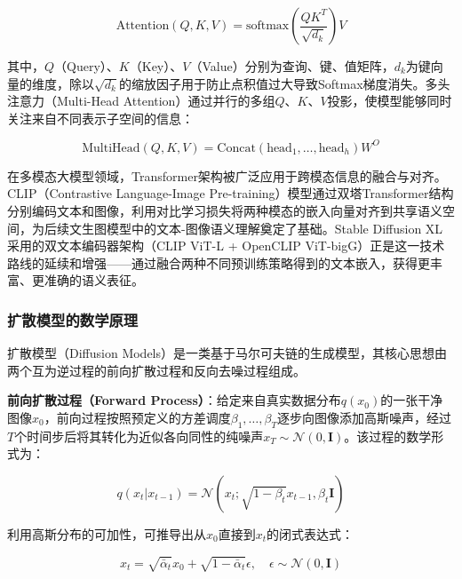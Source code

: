 \documentclass[12pt,a4paper]{ctexart}
\newcommand{\sdxl}{Stable Diffusion XL}
\begin{document}
\begin{equation}
\text{Attention}(Q, K, V) = \text{softmax}\left(\frac{QK^T}{\sqrt{d_k}}\right)V
\label{eq:attention}
\end{equation}

其中，$Q$（Query）、$K$（Key）、$V$（Value）分别为查询、键、值矩阵，$d_k$为键向量的维度，除以$\sqrt{d_k}$的缩放因子用于防止点积值过大导致Softmax梯度消失。多头注意力（Multi-Head Attention）通过并行的多组$Q$、$K$、$V$投影，使模型能够同时关注来自不同表示子空间的信息：

\begin{equation}
\text{MultiHead}(Q, K, V) = \text{Concat}(\text{head}_1, \ldots, \text{head}_h)W^O
\label{eq:mha}
\end{equation}

在多模态大模型领域，Transformer架构被广泛应用于跨模态信息的融合与对齐。CLIP（Contrastive Language-Image Pre-training）模型通过双塔Transformer结构分别编码文本和图像，利用对比学习损失将两种模态的嵌入向量对齐到共享语义空间，为后续文生图模型中的文本-图像语义理解奠定了基础。\sdxl{}采用的双文本编码器架构（CLIP ViT-L + OpenCLIP ViT-bigG）正是这一技术路线的延续和增强——通过融合两种不同预训练策略得到的文本嵌入，获得更丰富、更准确的语义表征。

\subsubsection{扩散模型的数学原理}

扩散模型（Diffusion Models）是一类基于马尔可夫链的生成模型，其核心思想由两个互为逆过程的前向扩散过程和反向去噪过程组成。

\textbf{前向扩散过程（Forward Process）}：给定来自真实数据分布$q(x_0)$的一张干净图像$x_0$，前向过程按照预定义的方差调度$\beta_1, \ldots, \beta_T$逐步向图像添加高斯噪声，经过$T$个时间步后将其转化为近似各向同性的纯噪声$x_T \sim \mathcal{N}(0, \mathbf{I})$。该过程的数学形式为：

\begin{equation}
q(x_t | x_{t-1}) = \mathcal{N}(x_t; \sqrt{1 - \beta_t} x_{t-1}, \beta_t \mathbf{I})
\label{eq:forward}
\end{equation}

利用高斯分布的可加性，可推导出从$x_0$直接到$x_t$的闭式表达式：

\begin{equation}
x_t = \sqrt{\bar{\alpha}_t} x_0 + \sqrt{1 - \bar{\alpha}_t} \epsilon, \quad \epsilon \sim \mathcal{N}(0, \mathbf{I})
\label{eq:forward-closed}
\end{equation}
\end{document}
